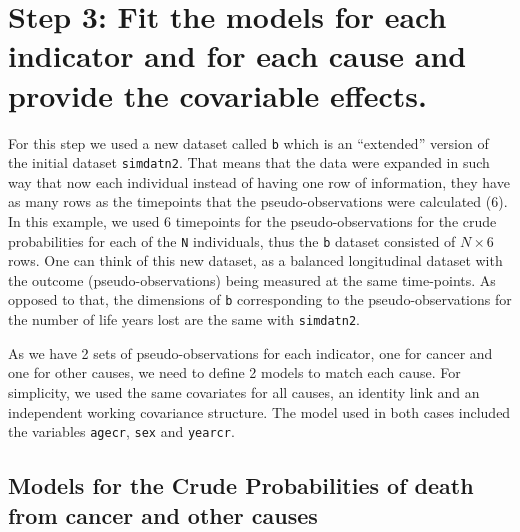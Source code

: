 \documentclass[a4paper,11pt]{article}\usepackage[]{graphicx}\usepackage[]{color}
\begin{document}
\section{Step 3: Fit the models for each indicator and for each cause and provide the covariable effects.}

For this step we used a new dataset called \texttt{b} which is an ``extended'' version of the initial dataset \texttt{simdatn2}. That means that the data were expanded in such way that now each individual instead of having one row of information, they have as many rows as the timepoints that the pseudo-observations were calculated (6). In this example, we used 6 timepoints for the pseudo-observations for the crude probabilities for each of the \texttt{N} individuals, thus the \texttt{b} dataset consisted of $N \times 6$ rows. One can think of this new dataset, as a balanced longitudinal dataset with the outcome (pseudo-observations) being measured at the same time-points. As opposed to that, the dimensions of \texttt{b} corresponding to the pseudo-observations for the number of life years lost are the same with \texttt{simdatn2}. 

As we have 2 sets of pseudo-observations for each indicator, one for cancer and one for other causes, we need to define 2 models to match each cause. For simplicity, we used the same covariates for all causes, an identity link and an independent working covariance structure. The model used in both cases included the variables \texttt{agecr}, \texttt{sex} and \texttt{yearcr}. 

\subsection{Models for the Crude Probabilities of death from cancer and other causes}
\end{document}
